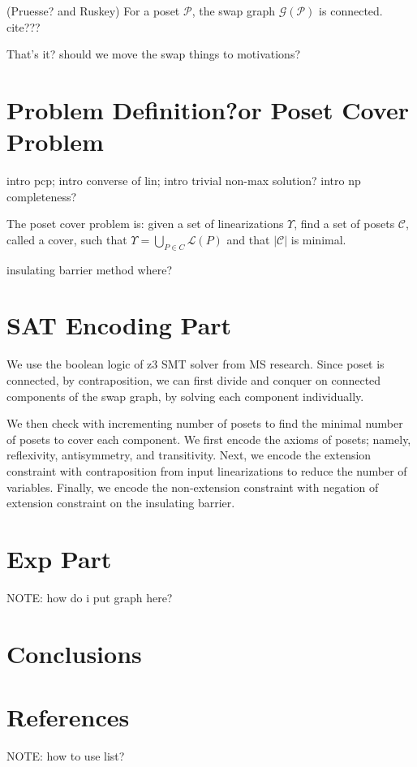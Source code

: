 \documentclass{llncs}
\begin{document}
\begin{theorem}
    (Pruesse? and Ruskey) For a poset $\mathcal{P}$, the swap graph $\mathcal{G}(\mathcal{P})$ is connected. cite???
\end{theorem}

That's it? should we move the swap things to motivations?

\section{Problem Definition?or Poset Cover Problem}
intro pcp; intro converse of lin; intro trivial non-max solution? intro np completeness?

The poset cover problem is: given a set of linearizations $\Upsilon$, find a set of posets $\mathcal{C}$, called a cover, such that $\Upsilon = \bigcup_{P \in C} \mathcal{L}(P)$ and that $|\mathcal{C}|$ is minimal.

\begin{theorem}
    insulating barrier method where?
\end{theorem}

\section{SAT Encoding Part}
We use the boolean logic of z3 SMT solver from MS research. Since poset is connected, by contraposition, we can first divide and conquer on connected components of the swap graph, by solving each component individually.

We then check with incrementing number of posets to find the minimal number of posets to cover each component. We first encode the axioms of posets; namely, reflexivity, antisymmetry, and transitivity. Next, we encode the extension constraint with contraposition from input linearizations to reduce the number of variables. Finally, we encode the non-extension constraint with negation of extension constraint on the insulating barrier.

\section{Exp Part}
NOTE: how do i put graph here?

\section{Conclusions}

\section{References}
NOTE: how to use list?
\end{document}
